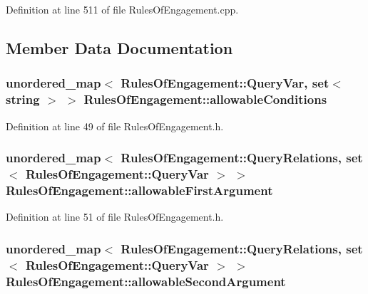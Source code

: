 Definition at line 511 of file Rules\-Of\-Engagement.\-cpp.



\subsection{Member Data Documentation}
\hypertarget{class_rules_of_engagement_af8095e34ef7cd49343e8d2dfd1f47e3e}{
\subsubsection[{allowable\-Conditions}]{\setlength{\rightskip}{0pt plus 5cm}unordered\-\_\-map$<$ {\bf Rules\-Of\-Engagement\-::\-Query\-Var}, set$<$ string $>$ $>$ Rules\-Of\-Engagement\-::allowable\-Conditions\hspace{0.3cm}{\ttfamily [static]}}}\label{class_rules_of_engagement_af8095e34ef7cd49343e8d2dfd1f47e3e}


Definition at line 49 of file Rules\-Of\-Engagement.\-h.

\hypertarget{class_rules_of_engagement_a0a16b8602e2522f007f54f157a0f1203}{
\subsubsection[{allowable\-First\-Argument}]{\setlength{\rightskip}{0pt plus 5cm}unordered\-\_\-map$<$ {\bf Rules\-Of\-Engagement\-::\-Query\-Relations}, set$<$ {\bf Rules\-Of\-Engagement\-::\-Query\-Var} $>$ $>$ Rules\-Of\-Engagement\-::allowable\-First\-Argument\hspace{0.3cm}{\ttfamily [static]}}}\label{class_rules_of_engagement_a0a16b8602e2522f007f54f157a0f1203}


Definition at line 51 of file Rules\-Of\-Engagement.\-h.

\hypertarget{class_rules_of_engagement_a365f61557120f33a18021667e746f13e}{
\subsubsection[{allowable\-Second\-Argument}]{\setlength{\rightskip}{0pt plus 5cm}unordered\-\_\-map$<$ {\bf Rules\-Of\-Engagement\-::\-Query\-Relations}, set$<$ {\bf Rules\-Of\-Engagement\-::\-Query\-Var} $>$ $>$ Rules\-Of\-Engagement\-::allowable\-Second\-Argument\hspace{0.3cm}{\ttfamily [static]}}}\label{class_rules_of_engagement_a365f61557120f33a18021667e746f13e}


